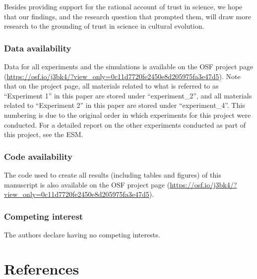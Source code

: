\documentclass[
  english,
  doc,floatsintext]{apa6}
\begin{document}
Besides providing support for the rational account of trust in science, we hope that our findings, and the research question that prompted them, will draw more research to the grounding of trust in science in cultural evolution.

\subsubsection{Data availability}\label{data-availability}

Data for all experiments and the simulations is available on the OSF project page (\url{https://osf.io/j3bk4/?view_only=0c11d7720fe2450e8d205975fa3e47d5}). Note that on the project page, all materials related to what is referred to as ``Experiment 1'' in this paper are stored under ``experiment\_2'', and all materials related to ``Experiment 2'' in this paper are stored under ``experiment\_4''. This numbering is due to the original order in which experiments for this project were conducted. For a detailed report on the other experiments conducted as part of this project, see the ESM.

\subsubsection{Code availability}\label{code-availability}

The code used to create all results (including tables and figures) of this manuscript is also available on the OSF project page (\url{https://osf.io/j3bk4/?view_only=0c11d7720fe2450e8d205975fa3e47d5}).

\subsubsection{Competing interest}\label{competing-interest}

The authors declare having no competing interests.

\FloatBarrier

\section{References}\label{references}
\end{document}
